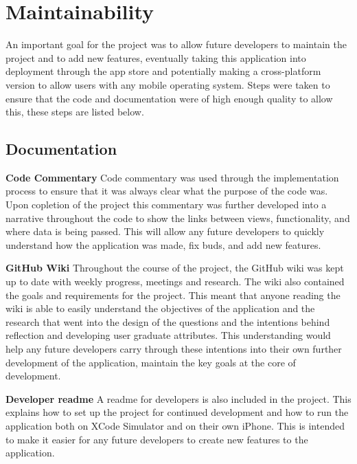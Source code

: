 \documentclass{l4proj}
\begin{document}
\section{Maintainability}
An important goal for the project was to allow future developers to maintain the project and to add new features, eventually taking this application into 
deployment through the app store and potentially making a cross-platform version to allow users with any mobile operating system. Steps were taken to ensure that 
the code and documentation were of high enough quality to allow this, these steps are listed below.

\subsection{Documentation}

\textbf{Code Commentary} Code commentary was used through the implementation process to ensure that it was always clear what the purpose of the code was. Upon
copletion of the project this commentary was further developed into a narrative throughout the code to show the links between views, functionality, and where
data is being passed. This will allow any future developers to quickly understand how the application was made, fix buds, and add new features.

\textbf{GitHub Wiki} Throughout the course of the project, the GitHub wiki was kept up to date with weekly progress, meetings and research. The wiki also 
contained the goals and requirements for the project. This meant that anyone reading the wiki is able to easily understand the objectives of the application
and the research that went into the design of the questions and the intentions behind reflection and developing user graduate attributes. This understanding
would help any future developers carry through these intentions into their own further development of the application, maintain the key goals at the core
of development. 

\textbf{Developer readme} A readme for developers is also included in the project. This explains how to set up the project for continued development and how
to run the application both on XCode Simulator and on their own iPhone. This is intended to make it easier for any future developers to create new features
to the application. 


\end{document}
